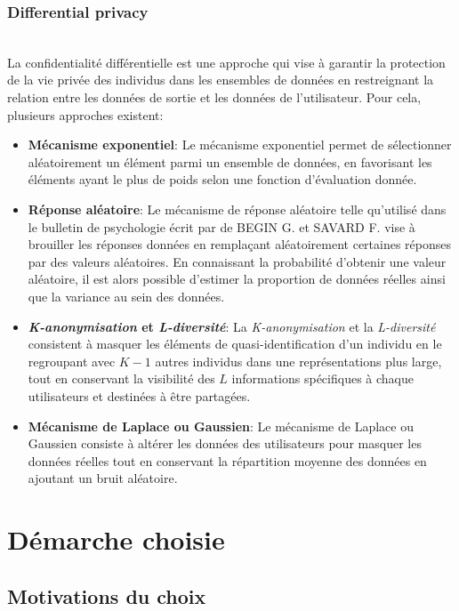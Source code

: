 \documentclass{article}
\begin{document}
\subsubsection{Differential privacy}
$ $\\
La confidentialité différentielle est une approche qui vise à garantir la protection de la vie privée des individus dans les ensembles de données en restreignant la relation entre les données de sortie et les données de l'utilisateur.
Pour cela, plusieurs approches existent:\\
\begin{itemize}
    \item \textbf{Mécanisme exponentiel}: Le mécanisme exponentiel \cite{programming_dp} permet de sélectionner aléatoirement un élément parmi un ensemble de données, en favorisant les éléments ayant le plus de poids selon une fonction d'évaluation donnée.
    \item \textbf{Réponse aléatoire}: Le mécanisme de réponse aléatoire telle qu'utilisé dans le bulletin de psychologie écrit par de BEGIN G. et SAVARD F. \cite{psychologie} vise à brouiller les réponses données en remplaçant aléatoirement certaines réponses par des valeurs aléatoires.
    En connaissant la probabilité d'obtenir une valeur aléatoire, il est alors possible d'estimer la proportion de données réelles ainsi que la variance au sein des données.
    \item \textbf{\emph{K-anonymisation} et \emph{L-diversité}}: La \emph{K-anonymisation}\cite{kanonymisation} et la \emph{L-diversité} consistent à masquer les éléments de quasi-identification d'un
    individu en le regroupant avec $K-1$ autres individus dans une représentations plus large, tout en conservant la visibilité des $L$ informations spécifiques à chaque utilisateurs et destinées à être partagées.
    \item \textbf{Mécanisme de Laplace ou Gaussien}: Le mécanisme de Laplace ou Gaussien \cite{laplace&gauss} consiste à altérer les données des utilisateurs pour masquer les données réelles tout en conservant la répartition moyenne des données en ajoutant un bruit aléatoire.
\end{itemize}

\section{Démarche choisie}
\subsection{Motivations du choix}
\end{document}

